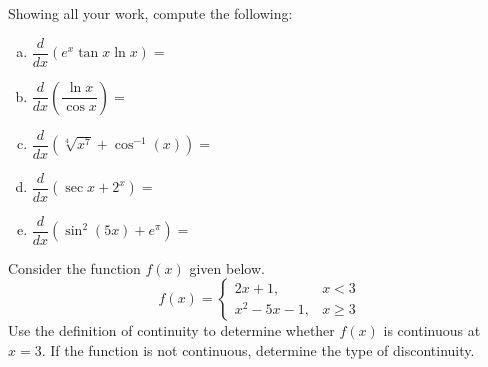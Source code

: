 \documentclass[12pt,letterpaper]{exam}
\begin{document}
\begin{questions}
\newpage
\question[20] Showing all your work, compute the following: \par\vspace{0.5cm}
	\begin{enumerate}[(a)]
	\item $\dfrac{d}{dx} \left(e^x \tan x \ln x \right)=$ \vfill
	\item $\dfrac{d}{dx} \left( \dfrac{\ln x}{\cos x} \right)= $ \vfill
	\item $\dfrac{d}{dx} \left( \sqrt[4]{x^7} + \cos^{-1}(x) \right)=$ \vfill
	\item $\dfrac{d}{dx} \left( \sec x + 2^x \right)=$ \vfill
	\item $\dfrac{d}{dx} \left( \sin^2(5x) + e^\pi \right)=$ \vfill
	\end{enumerate}



\newpage
\question[20] Consider the function $f(x)$ given below.
	\[
	f(x)= 
	\begin{cases}
	2x + 1, & x < 3 \\
	x^2 - 5x - 1, & x \geq 3
	\end{cases}
	\]
Use the definition of continuity to determine whether $f(x)$ is continuous at $x= 3$. If the function is not continuous, determine the type of discontinuity. 

\end{questions}
\end{document}
